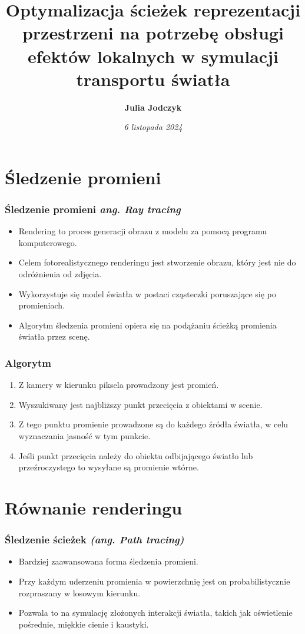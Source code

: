 \documentclass{beamer}
\title[ \insertframenumber/\inserttotalframenumber]{Optymalizacja ścieżek reprezentacji przestrzeni na potrzebę obsługi efektów lokalnych w symulacji transportu światła}
\author[Julia Jodczyk]{\textbf{Julia Jodczyk}}
\institute{Instytut Informatyki \\
dr inż. Łukasz Dąbała}
\date{\tiny{\emph{6 listopada 2024
}}}
\begin{document}
\frame{\titlepage}


\section{Śledzenie promieni}
\begin{frame}
\frametitle{Śledzenie promieni \it{ang. Ray tracing}}
\begin{itemize}
    \item Rendering to proces generacji obrazu z modelu za pomocą programu komputerowego.
    \item Celem fotorealistycznego renderingu jest stworzenie obrazu, który jest nie do odróżnienia od zdjęcia.
    \item Wykorzystuje się model światła w postaci cząsteczki poruszające się po promieniach.
    \item Algorytm śledzenia promieni opiera się na podążaniu ścieżką promienia światła przez scenę.
\end{itemize}
\end{frame}

\begin{frame}
\frametitle{Algorytm}
\begin{enumerate}
    \item Z kamery w kierunku piksela prowadzony jest promień.
    \item Wyszukiwany jest najbliższy punkt przecięcia z obiektami w scenie.
    \item Z tego punktu promienie prowadzone są do każdego źródła światła, w celu wyznaczania jasność w tym punkcie.
    \item Jeśli punkt przecięcia należy do obiektu odbijającego światło lub przeźroczystego to wysyłane są promienie wtórne.
\end{enumerate}
\end{frame}


\section{Równanie renderingu}
\begin{frame}
\frametitle{Śledzenie ścieżek \it{(ang. Path tracing)}}
\begin{itemize}
    \item Bardziej zaawansowana forma śledzenia promieni.
    \item Przy każdym uderzeniu promienia w powierzchnię jest on probabilistycznie rozpraszany w losowym kierunku.
    \item Pozwala to na symulację złożonych interakcji światła, takich jak oświetlenie pośrednie, miękkie cienie i kaustyki.
\end{itemize}
\end{frame}
\end{document}
